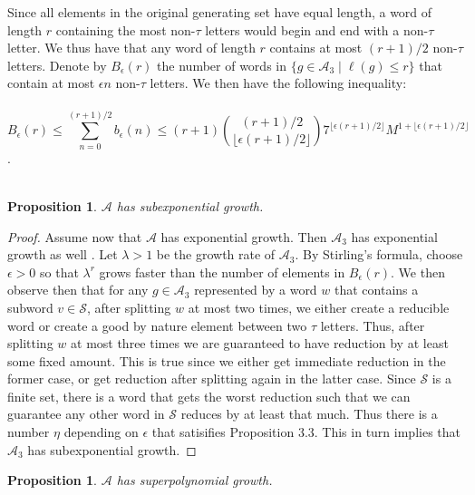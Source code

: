\documentclass[11pt]{amsart}
\newtheorem{proposition}[theorem]{Proposition}
\theoremstyle{definition}
\theoremstyle{remark}
\numberwithin{equation}{section}
\begin{document}
Since all elements in the original generating set have equal length, a  word of length $r$ containing the most non-$\tau$ letters would begin and end with a non-$\tau$ letter. We thus have that any word of length $r$ contains at most $(r+1)/2$ non-$\tau$ letters. Denote by $ B_{\epsilon}(r)$ the number of words in $ \{g \in \mathcal{A}_3 \mid \ell(g) \leq r\} $ that contain at most $ \epsilon n $ non-$\tau$ letters. We then have the following inequality: \\ \\ $$ B_{\epsilon}(r) \leq \displaystyle{ \sum_{n=0}^{(r+1)/2} b_{\epsilon}(n) } \leq \displaystyle{  (r+1) \displaystyle{ (r+1)/2 \choose \lfloor \epsilon (r+1)/2 \rfloor } 7^{ \lfloor \epsilon (r+1)/2 \rfloor } M^{1 + \lfloor \epsilon (r+1)/2 \rfloor} } $$. \\ \\
\begin{proposition}
$\mathcal{A}$ has subexponential growth.
\end{proposition}
\begin{proof}
Assume now that $\mathcal{A}$ has exponential growth. Then $\mathcal{A}_3$ has exponential growth as well \cite{BuxP}. Let $ \lambda > 1 $ be the growth rate of $\mathcal{A}_3$. By Stirling's formula, choose $\epsilon > 0$ so that $\lambda^{r}$ grows faster than the number of elements in $B_{\epsilon}(r)$.
We then observe then that for any $g \in \mathcal{A}_3$ represented by a word $w$ that contains a subword $v \in \mathcal{S}$, after splitting $w$ at most two times, we either create a reducible word or create a good by nature element between two $\tau$ letters. Thus, after splitting $w$ at most three times we are guaranteed to have reduction by at least some fixed amount. This is true since we either get immediate reduction in the former case, or get reduction after splitting again in the latter case. Since $\mathcal{S}$ is a finite set, there is a word that gets the worst reduction such that we can guarantee any other word in $\mathcal{S}$ reduces by at least that much.  Thus there is a number $\eta$ depending on $\epsilon$ that satisifies Proposition 3.3. This in turn implies that $\mathcal{A}_3$ has subexponential growth. 
\end{proof}
\begin{proposition}
$\mathcal{A}$ has superpolynomial growth. 
\end{proposition}
\end{document}
